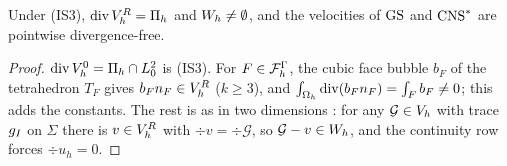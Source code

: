 \begin{lemma}\label{st:divrange}
Under (IS3), $\operatorname{div}V_h^R=\Pi_h$ and $W_h\ne\emptyset$, and the velocities of $\mathrm{GS}$ and $\mathrm{CNS}^\ast$ are pointwise divergence-free.
\end{lemma}

\begin{proof}
$\operatorname{div}V_h^0=\Pi_h\cap L^2_0$ is (IS3). For $F\in\mathcal F_h^\Gamma$, the cubic face bubble $b_F$ of the tetrahedron $T_F$ gives $b_Fn_F\in V_h^R$ ($k\ge3$), and $\int_{\Omega_h}\operatorname{div}(b_Fn_F)=\int_Fb_F\ne0$; this adds the constants. The rest is as in two dimensions \cite{PadhiLong2D}: for any $\mathcal G\in V_h$ with trace $g_I$ on $\Sigma$ there is $v\in V_h^R$ with $\div v=\div\mathcal G$, so $\mathcal G-v\in W_h$, and the continuity row forces $\div u_h=0$.
\end{proof}
